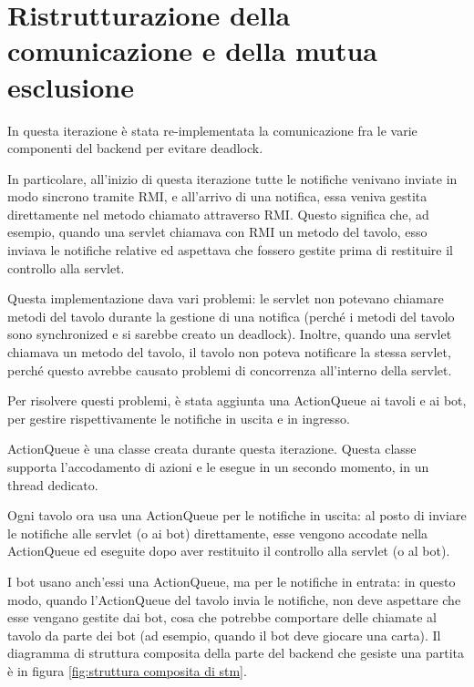 \section{Ristrutturazione della comunicazione e della mutua esclusione}
  In questa iterazione \`e stata re-implementata la comunicazione fra le varie
  componenti del backend per evitare deadlock.

  In particolare, all'inizio di questa iterazione tutte le notifiche venivano
  inviate in modo sincrono tramite RMI, e all'arrivo di una notifica, essa
  veniva gestita direttamente nel metodo chiamato attraverso RMI. Questo
  significa che, ad esempio, quando una servlet chiamava con RMI un metodo
  del tavolo, esso inviava le notifiche relative ed aspettava che fossero
  gestite prima di restituire il controllo alla servlet.

  Questa implementazione dava vari problemi: le servlet non potevano chiamare
  metodi del tavolo durante la gestione di una notifica (perch\'e i metodi
  del tavolo sono synchronized e si sarebbe creato un deadlock).
  Inoltre, quando una servlet chiamava un metodo del tavolo, il tavolo non
  poteva notificare la stessa servlet, perch\'e questo avrebbe causato
  problemi di concorrenza all'interno della servlet.

  Per risolvere questi problemi, \`e stata aggiunta una ActionQueue ai tavoli
  e ai bot, per gestire rispettivamente le notifiche in uscita e in ingresso.

  ActionQueue \`e una classe creata durante questa iterazione. Questa classe
  supporta l'accodamento di azioni e le esegue in un secondo momento, in un
  thread dedicato.

  Ogni tavolo ora usa una ActionQueue per le notifiche in uscita:
  al posto di inviare le notifiche alle servlet (o ai bot) direttamente, esse
  vengono accodate nella ActionQueue ed eseguite dopo aver restituito il
  controllo alla servlet (o al bot).

  I bot usano anch'essi una ActionQueue, ma per le notifiche in entrata:
  in questo modo, quando l'ActionQueue del tavolo invia le notifiche, non
  deve aspettare che esse vengano gestite dai bot, cosa che potrebbe
  comportare delle chiamate al tavolo da parte dei bot (ad esempio, quando
  il bot deve giocare una carta).
  Il diagramma di struttura composita della parte del backend che gesiste una 
  partita \`e in figura \ref{fig:struttura composita di stm}.

